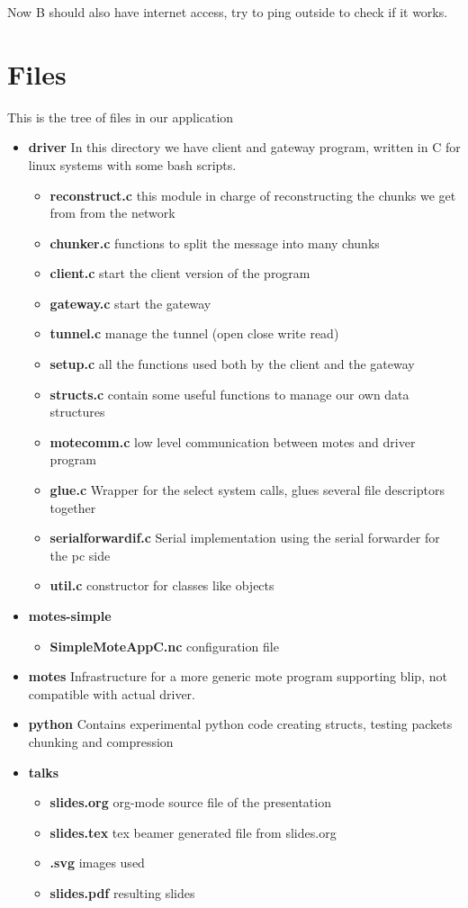 \documentclass[11pt]{article}
\begin{document}
  
  Now B should also have internet access, try to ping outside to check if it works.
\section*{Files}
\label{sec-3}

  This is the tree of files in our application
\begin{itemize}
\item \textbf{driver}
    In this directory we have client and gateway program, written in C for linux systems with some bash scripts.

\begin{itemize}
\item \textbf{reconstruct.c}
      this module in charge of reconstructing the chunks we get from from the network
\item \textbf{chunker.c}
      functions to split the message into many chunks
\item \textbf{client.c}
      start the client version of the program
\item \textbf{gateway.c}
      start the gateway
\item \textbf{tunnel.c}
      manage the tunnel (open close write read)
\item \textbf{setup.c}
      all the functions used both by the client and the gateway
\item \textbf{structs.c}
      contain some useful functions to manage our own data structures
\item \textbf{motecomm.c}
      low level communication between motes and driver program
\item \textbf{glue.c}
      Wrapper for the select system calls, glues several file descriptors together
\item \textbf{serialforwardif.c}
      Serial implementation using the serial forwarder for the pc side
\item \textbf{util.c}
      constructor for classes like objects
\end{itemize}

\item \textbf{motes-simple}

\begin{itemize}
\item \textbf{SimpleMoteAppC.nc}
      configuration file
\end{itemize}

\item \textbf{motes}
    Infrastructure for a more generic mote program supporting blip, not compatible with actual driver.
\item \textbf{python}
    Contains experimental python code creating structs, testing packets chunking and compression
\item \textbf{talks}

\begin{itemize}
\item \textbf{slides.org}
      org-mode source file of the presentation
\item \textbf{slides.tex}
      tex beamer generated file from slides.org
\item \textbf{.svg}
      images used
\item \textbf{slides.pdf}
      resulting slides
\end{itemize}

\end{itemize}
\end{document}
